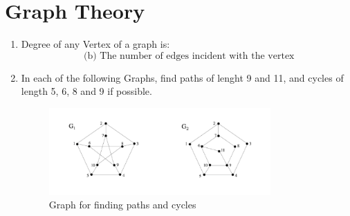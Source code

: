 \documentclass[a3paper,12pt]{extarticle} %
\begin{document}
\section{Graph Theory}
\begin{enumerate}
    \item Degree of any Vertex of a graph is:
    \[
        \text{ (b) The number of edges incident with the vertex}
    \]
    \item In each of the following Graphs, find paths of lenght 9 and 11, and cycles of length 5, 6, 8 and 9 if possible.
    \begin{figure}[h!]
        \centering
        \includegraphics[width=0.8\textwidth]{PGM-graph.png}
        \caption{Graph for finding paths and cycles}
        \label{fig:pgm-graph}
    \end{figure}
\end{enumerate}
\end{document}
